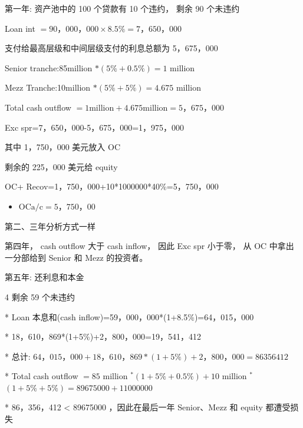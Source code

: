 第一年: 资产池中的 100 个贷款有 10 个违约， 剩余 90 个未违约

Loan int \(= {90}，{000}，{000} \times  {8.5}\%  = 7，{650}，{000}\)

支付给最高层级和中间层级支付的利息总额为 5，675，000

Senior tranche:85million \(* \left( {5\%  + {0.5}\% }\right)  = 1\) million

Mezz Tranche:10million \(* \left( {5\%  + 5\% }\right)  = {4.675}\) million

Total cash outflow \(= 1\mathrm{{million}} + {4.675}\mathrm{{million}} = 5，{675}，{000}\)

Exc spr=7，650，000-5，675，000=1，975，000

其中 1，750，000 美元放入 OC

剩余的 225，000 美元给 equity

OC+ Recov=1，750，000+10*1000000*40\%=5，750，000

\begin{itemize}
\item \(\mathrm{{OCa}}/\mathrm{c} = 5，{750}，{00}\)
\end{itemize}

第二、三年分析方式一样

第四年， cash outflow 大于 cash inflow， 因此 Exc spr 小于零， 从 OC 中拿出一分部给到 Senior 和 Mezz 的投资者。

第五年: 还利息和本金

4 剩余 59 个未违约

* Loan 本息和(cash inflow)=59，000，000*(1+8.5\%)=64，015，000

* 18，610，869*(1+5\%)+2，800，000=19，541，412

* 总计: \({64}，{015}，{000} + {18}，{610}，{869} * \left( {1 + 5\% }\right)  + 2，{800}，{000} = {86356412}\)

* Total cash outflow \(= {85}\) million \({}^{ * }\left( {1 + 5\%  + {0.5}\% }\right)  + {10}\) million \({}^{ * }\)  \(\left( {1 + 5\%  + 5\% }\right)  = {89675000} + {11000000}\)

* 86，356，412 < 89675000 ，因此在最后一年 Senior、Mezz 和 equity 都遭受损失

